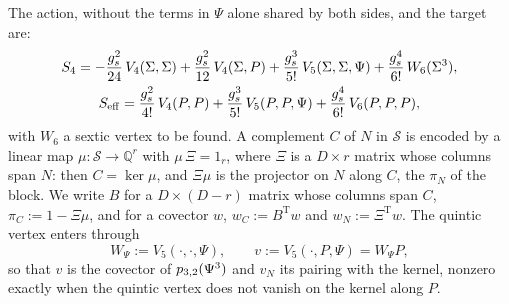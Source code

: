 The action, without the terms in $\Psi$ alone shared by both sides, and the target are:
\begin{equation}
  \label{eq:mult:hyb:action}
  \begin{gathered}
    S_4
      = - \frac{g_s^2}{24} \, V_4(\Sigma, \Sigma)
        + \frac{g_s^2}{12} \, V_4(\Sigma, P)
        + \frac{g_s^3}{5!} \, V_5(\Sigma, \Sigma, \Psi)
        + \frac{g_s^4}{6!} \, W_6(\Sigma^3),
    \\
    S_{\mathrm{eff}}
      = \frac{g_s^2}{4!} \, V_4(P, P)
        + \frac{g_s^3}{5!} \, V_5(P, P, \Psi)
        + \frac{g_s^4}{6!} \, V_6(P, P, P),
  \end{gathered}
\end{equation}
with $W_6$ a sextic vertex to be found.
A complement $C$ of $N$ in $\mathcal S$ is encoded by a linear map $\mu \colon \mathcal S \to \mathbb{Q}^r$ with $\mu \, \Xi = 1_r$, where $\Xi$ is a $D \times r$ matrix whose columns span $N$: then $C = \ker \mu$, and $\Xi \mu$ is the projector on $N$ along $C$, the $\pi_N$ of the block.
We write $B$ for a $D \times (D - r)$ matrix whose columns span $C$, $\pi_C := 1 - \Xi \mu$, and for a covector $w$, $w_C := B^{\mathrm{T}} w$ and $w_N := \Xi^{\mathrm{T}} w$.
The quintic vertex enters through
\begin{equation}
  W_\Psi
    := V_5(\cdot, \cdot, \Psi),
  \qquad
  v
    := V_5(\cdot, P, \Psi)
    = W_\Psi P,
\end{equation}
so that $v$ is the covector of $p_{3,2}(\Psi^3)$ and $v_N$ its pairing with the kernel, nonzero exactly when the quintic vertex does not vanish on the kernel along $P$.

